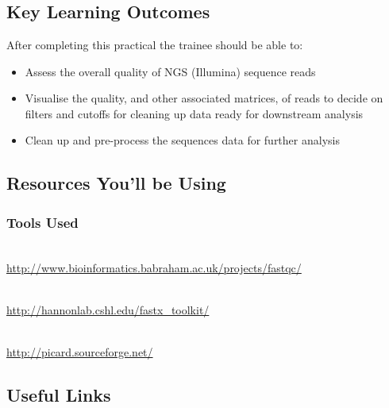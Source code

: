 
\chapter{\moduleTitle}
\newpage

\section{Key Learning Outcomes}

After completing this practical the trainee should be able to:
\begin{itemize}
  \item Assess the overall quality of NGS (Illumina) sequence reads
  \item Visualise the quality, and other associated matrices, of reads to decide
        on filters and cutoffs for cleaning up data ready for downstream analysis
  \item Clean up and pre-process the sequences data for further analysis
\end{itemize}

\section{Resources You'll be Using}
 
\subsection{Tools Used}
\begin{description}[style=multiline,labelindent=0cm,align=left,leftmargin=0.5cm]
  \item[FastQC]\hfill\\
  	\url{http://www.bioinformatics.babraham.ac.uk/projects/fastqc/}
  \item[FASTX-Toolkit]\hfill\\
  	\url{http://hannonlab.cshl.edu/fastx_toolkit/}
  \item[Picard]\hfill\\
  	\url{http://picard.sourceforge.net/}
\end{description}

\section{Useful Links}
 
